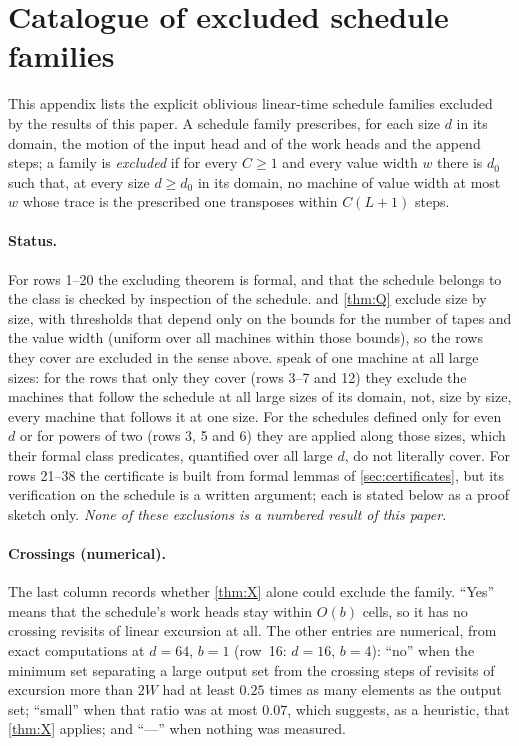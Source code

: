 \section{Catalogue of excluded schedule families}\label{app:catalogue}

This appendix lists the explicit oblivious linear-time schedule families excluded by the results of this paper. A schedule family
prescribes, for each size $d$ in its domain, the motion of the input head and of the work heads and the append steps; a family is
\emph{excluded} if for every $C\ge1$ and every value width $w$ there is $d_0$ such that, at every size $d\ge d_0$ in its domain, no machine of
value width at most $w$ whose trace is the prescribed one transposes within $C(L+1)$ steps.

\paragraph{Status.} For rows 1--20 the excluding theorem is formal, and that the schedule belongs to the class is checked by inspection
of the schedule.  and \cref{thm:Q} exclude size by size, with thresholds that depend only on the bounds for the number of tapes and the
value width (uniform over all machines within those bounds),
so the rows they cover are excluded in the sense above.  speak of one machine at all large sizes: for the rows that
only they cover (rows 3--7 and 12) they exclude the machines that follow the schedule at all large sizes of its domain, not, size by size,
every machine that follows it at one size. For the schedules defined only for even $d$ or for powers of two (rows 3, 5 and 6) they are
applied along those sizes, which their formal class predicates, quantified over all large $d$, do not literally cover. For rows 21--38 the certificate is
built from formal lemmas of \cref{sec:certificates}, but its verification on the schedule is a written argument; each is stated below as a
proof sketch only. \emph{None of these exclusions is a numbered result of this paper.}

\paragraph{Crossings (numerical).} The last column records whether \cref{thm:X} alone could exclude the family. ``Yes'' means that the
schedule's work heads stay within $O(b)$ cells, so it has no crossing revisits of linear excursion at all. The other entries are
numerical, from exact computations at $d=64$, $b=1$ (row~16: $d=16$, $b=4$): ``no'' when the minimum set separating a large output set from
the crossing steps of
revisits of excursion more than $2W$ had at least $0.25$ times as many elements as the output set; ``small'' when that ratio was at most
$0.07$, which suggests, as a heuristic, that \cref{thm:X} applies; and ``---'' when nothing was measured.


